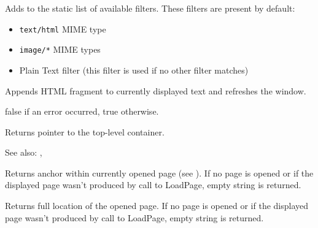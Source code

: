 \label{wxhtmlwindowaddfilter}


Adds  to the static list of available
filters. These filters are present by default:

\begin{itemize}\itemsep=0pt
\item {\tt text/html} MIME type
\item {\tt image/*} MIME types
\item Plain Text filter (this filter is used if no other filter matches)
\end{itemize}

\label{wxhtmlwindowappendtopage}


Appends HTML fragment to currently displayed text and refreshes the window. 




false if an error occurred, true otherwise.

\label{wxhtmlwindowgetinternalrepresentation}


Returns pointer to the top-level container.

See also: , 

\label{wxhtmlwindowgetopenedanchor}


Returns anchor within currently opened page
(see ). 
If no page is opened or if the displayed page wasn't
produced by call to LoadPage, empty string is returned.


\label{wxhtmlwindowgetopenedpage}


Returns full location of the opened page. If no page is opened or if the displayed page wasn't
produced by call to LoadPage, empty string is returned.


